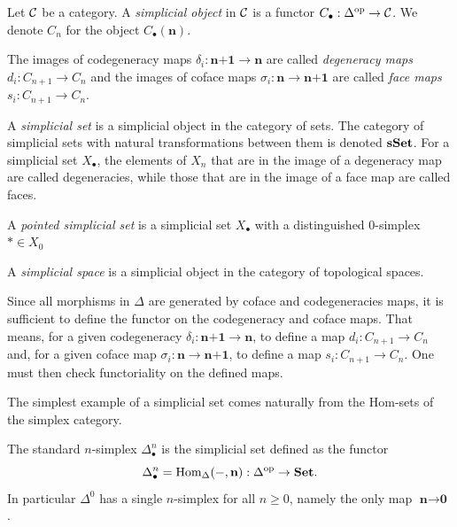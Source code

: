 \begin{definition}
    Let $\CC$ be a category. A \emph{simplicial object} in $\CC$ is a functor $C_{\bullet}: \op{\Delta} \to \CC$. We denote $C_n$ for the object $C_{\bullet}(\textbf{n})$.

    The images of codegeneracy maps $\delta_i : \textbf{n+1} \to \textbf{n}$ are called \emph{degeneracy maps} $d_i : C_{n+1} \to C_n$ and the images of coface maps $\sigma_i : \textbf{n} \to \textbf{n+1}$ are called \emph{face maps} $s_i : C_{n+1} \to C_{n}$.


    A \emph{simplicial set} is a simplicial object in the category of sets. The category of simplicial sets with natural transformations between them is denoted $\sSet$. For a simplicial set $X_{\bullet}$, the elements of $X_n$ that are in the image of a degeneracy map are called degeneracies, while those that are in the image of a face map are called faces.

    A \emph{pointed simplicial set} is a simplicial set $X_\bullet$ with a distinguished $0$-simplex $* \in X_0$
    
    A \emph{simplicial space} is a simplicial object in the category of topological spaces.
\end{definition}

Since all morphisms in $\Delta$ are generated by coface and codegeneracies maps, it is sufficient to define the functor on the codegeneracy and coface maps. That means, for a given codegeneracy $\delta_i : \textbf{n+1} \to \textbf{n}$, to define a map $d_i: C_{n+1} \to C_n$ and, for a given coface map $\sigma_i : \textbf{n} \to \textbf{n+1}$, to define a map $s_i : C_{n+1} \to C_{n}$. One must then check functoriality on the defined maps.

The simplest example of a simplicial set comes naturally from the Hom-sets of the simplex category.

\begin{example}
    The standard $n$-simplex $\Delta^n_{\bullet}$ is the simplicial set defined as the functor
    \[ \Delta^n_{\bullet} = \Hom[\Delta]{-}{\textbf{n}} : \op{\Delta} \to \Set. \]
    In particular $\Delta^0$ has a single $n$-simplex for all $n \geq 0$, namely the only map $\textbf{n} \to \textbf{0}$.
\end{example}


